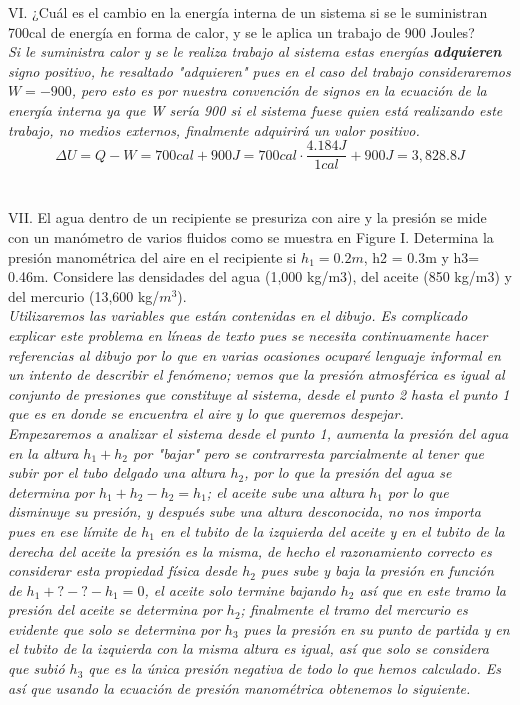\documentclass{article}
\begin{document}
VI. ¿Cuál es el cambio en la energía interna de un sistema si se le suministran 700cal de energía en forma de calor, y se le aplica un trabajo de 900 Joules?\\
\textit{Si le suministra calor y se le realiza trabajo al sistema estas energías \textbf{adquieren} signo positivo, he resaltado "adquieren" pues en el caso del trabajo consideraremos $W=-900$, pero esto es por nuestra convención de signos en la ecuación de la energía interna ya que W sería 900 si el sistema fuese quien está realizando este trabajo, no medios externos, finalmente adquirirá un valor positivo.}
\begin{equation*}
    \Delta U = Q - W = 700cal + 900J = 700cal \cdot \frac{4.184J}{1cal} + 900J = 3,828.8 J
\end{equation*}
\\\\
VII. El agua dentro de un recipiente se presuriza con aire y la presión se mide con un manómetro de varios fluidos como se muestra en Figure I. Determina la presión manométrica del aire en el recipiente
si $h_1 = 0.2m$, h2 = 0.3m y h3= 0.46m. Considere las densidades del agua (1,000 kg/m3), del aceite (850 kg/m3) y del mercurio (13,600 kg/$m^3$). \\
\textit{Utilizaremos las variables que están contenidas en el dibujo. Es complicado explicar este problema en líneas de texto pues se necesita continuamente hacer referencias al dibujo por lo que en varias ocasiones ocuparé lenguaje informal en un intento de describir el fenómeno; vemos que la presión atmosférica es igual al conjunto de presiones que constituye al sistema, desde el punto 2 hasta el punto 1 que es en donde se encuentra el aire y lo que queremos despejar. \\}
\textit{Empezaremos a analizar el sistema desde el punto 1, aumenta la presión del agua en la altura $h_1+h_2$ por "bajar" pero se contrarresta parcialmente al tener que subir por el tubo delgado una altura $h_2$, por lo que la presión del agua se determina por $h_1+h_2-h_2=h_1$; el aceite sube una altura $h_1$ por lo que disminuye su presión, y después sube una altura desconocida, no nos importa pues en ese límite de $h_1$ en el tubito de la izquierda del aceite y en el tubito de la derecha del aceite la presión es la misma, de hecho el razonamiento correcto es considerar esta propiedad física desde $h_2$ pues sube y baja la presión en función de $h_1+?-?-h_1=0$, el aceite solo termine bajando $h_2$ así que en este tramo la presión del aceite se determina por $h_2$; finalmente el tramo del mercurio es evidente que solo se determina por $h_3$ pues la presión en su punto de partida y en el tubito de la izquierda con la misma altura es igual, así que solo se considera que subió $h_3$ que es la única presión negativa de todo lo que hemos calculado. Es así que usando la ecuación de presión manométrica obtenemos lo siguiente.}
\end{document}
